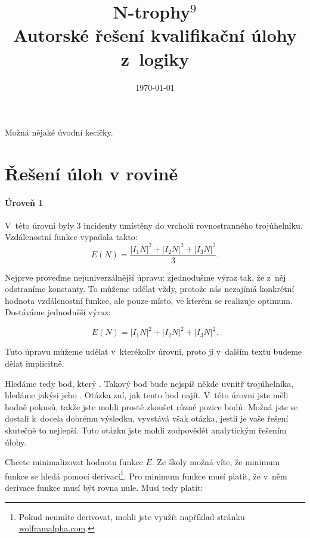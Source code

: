\documentclass[12pt,a4paper]{article}
\begin{document}
\pagestyle{fancy}     %
\setcounter{page}{1}  %

\fancyhead[R]{}

\title{N-trophy$^9$\\Autorské řešení kvalifikační úlohy z~logiky}
\date{\today}
\maketitle

\setlength{\parindent}{0cm}
\setlength{\parskip}{3mm plus2pt minus2pt}

Možná nějaké úvodní kecičky.

\section*{Řešení úloh v rovině}
\paragraph*{Úroveň 1}

V~této úrovni byly 3 incidenty umístěny do vrcholů rovnostranného trojúhelníku.
Vzdálenostní funkce vypadala takto:
$$E(N) = \frac{|I_1N|^2 + |I_2N|^2 + |I_3N|^2}{3}.$$

Nejprve proveďme nejuniverzálnější úpravu: zjednodušme výraz tak, že z~něj
odstraníme konstanty. To můžeme udělat vždy, protože nás nezajímá konkrétní
hodnota vzdálenostní funkce, ale pouze místo, ve kterém se realizuje optimum.
Dostáváme jednodušší výraz:

$$E(N) = |I_1N|^2 + |I_2N|^2 + |I_3N|^2.$$

Tuto úpravu můžeme udělat v~kterékoliv úrovni, proto ji v~dalším textu budeme
dělat implicitně.

Hledáme tedy bod, který . Takový bod bude
nejspíš někde uvnitř trojúhelníka, hledáme jakýsi jeho . Otázka zní,
jak tento bod najít. V~této úrovni jste měli hodně pokusů, takže jste mohli
prostě zkoušet různé pozice bodů. Možná jste se dostali k~docela dobrému
výsledku, vyvstává však otázka, jestli je vaše řešení skutečně to nejlepší.
Tuto otázku jste mohli zodpovědět analytickým řešením úlohy.

Chcete minimalizovat hodnotu funkce $E$. Ze školy možná víte, že minimum
funkce se hledá pomocí derivací\footnote{Pokud neumíte derivovat, mohli jste
využít například stránku \url{wolframalpha.com}.}. Pro minimum funkce musí
platit, že v~něm derivace funkce musí být rovna nule. Musí tedy platit:
\end{document}
